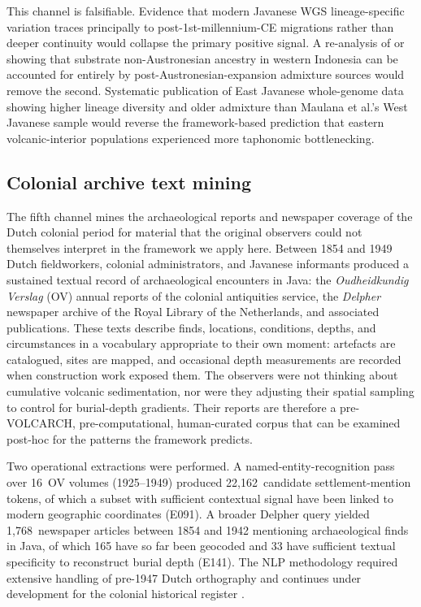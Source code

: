 \documentclass[12pt,a4paper]{article}
\begin{document}
This channel is falsifiable. Evidence that modern Javanese WGS lineage-specific variation traces principally to post-1st-millennium-CE migrations rather than deeper continuity would collapse the primary positive signal. A re-analysis of \citet{lipson2014} or \citet{larena2021} showing that substrate non-Austronesian ancestry in western Indonesia can be accounted for entirely by post-Austronesian-expansion admixture sources would remove the second. Systematic publication of East Javanese whole-genome data showing higher lineage diversity and older admixture than Maulana et al.'s West Javanese sample would reverse the framework-based prediction that eastern volcanic-interior populations experienced more taphonomic bottlenecking.


\subsection{Colonial archive text mining}
\label{sec:ch5}

The fifth channel mines the archaeological reports and newspaper coverage of the Dutch colonial period for material that the original observers could not themselves interpret in the framework we apply here. Between 1854 and 1949 Dutch fieldworkers, colonial administrators, and Javanese informants produced a sustained textual record of archaeological encounters in Java: the \textit{Oudheidkundig Verslag} (OV) annual reports of the colonial antiquities service, the \textit{Delpher} newspaper archive of the Royal Library of the Netherlands, and associated publications. These texts describe finds, locations, conditions, depths, and circumstances in a vocabulary appropriate to their own moment: artefacts are catalogued, sites are mapped, and occasional depth measurements are recorded when construction work exposed them. The observers were not thinking about cumulative volcanic sedimentation, nor were they adjusting their spatial sampling to control for burial-depth gradients. Their reports are therefore a pre-VOLCARCH, pre-computational, human-curated corpus that can be examined post-hoc for the patterns the framework predicts.

Two operational extractions were performed. A named-entity-recognition pass over 16~OV volumes (1925--1949) produced 22{,}162~candidate settlement-mention tokens, of which a subset with sufficient contextual signal have been linked to modern geographic coordinates (E091). A broader Delpher query yielded 1{,}768~newspaper articles between 1854 and 1942 mentioning archaeological finds in Java, of which 165 have so far been geocoded and 33 have sufficient textual specificity to reconstruct burial depth (E141). The NLP methodology required extensive handling of pre-1947 Dutch orthography and continues under development for the colonial historical register \citep{verberne2024}.
\end{document}

